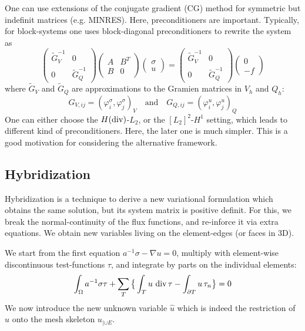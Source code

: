 One can use extensions of the conjugate gradient (CG) method for
symmetric but indefinit matrices (e.g. MINRES). Here, preconditioners
are important. Typically, for block-systems one uses block-diagonal
preconditioners to rewrite the system as
$$
\left( \begin{array}{cc}
  \widetilde G_V^{-1} & 0 \\ 0 & \widetilde G_Q^{-1} 
\end{array} \right) 
\left( \begin{array}{cc}
  A & B^T \\ B & 0 
\end{array} \right) 
\left( \begin{array}{cc}
         \sigma \\ u 
\end{array} \right) 
=
\left( \begin{array}{cc}
  \widetilde G_V^{-1} & 0 \\ 0 & \widetilde G_Q^{-1} 
\end{array} \right) 
\left( \begin{array}{cc}
         0 \\ -f
\end{array} \right) 
$$
where $\widetilde G_V$ and $\widetilde G_Q$ are approximations to the
Gramien matrices in $V_h$ and $Q_h$:
$$
G_{V,ij} = (\varphi_i^\sigma, \varphi_j^\sigma)_V \quad \text{and}
\quad G_{Q,ij} = (\varphi_i^u, \varphi_j^u)_Q
$$
One can either choose the $H (\operatorname{div})$-$L_2$, or the $[L_2]^2$-$H^1$
setting, which leads to different kind of preconditioners. Here, the
later one is much simpler. This is a good motivation for considering the alternative framework.
\subsection{Hybridization}
Hybridization is a technique to derive a new variational formulation
which obtains the same solution, but its system matrix is positive
definit. For this, we break the normal-continuity of the flux
functions, and re-inforce it via extra equations. We obtain new
variables living on the element-edges (or faces in 3D).

We start from the first equation $a^{-1} \sigma - \nabla u = 0$,
multiply with element-wise discontinuous test-functions $\tau$, and
integrate by parts on the individual elements:
$$
\int_\Omega a^{-1} \sigma \tau + \sum_T \big\{  \int_T u \, \operatorname{div}
\tau - \int_{\partial T} u \, \tau_n \big\} = 0
$$
We now introduce the new unknown variable $\hat u$ which is indeed 
the restriction of $u$ onto the mesh skeleton $u_{|\cup E}$. 

